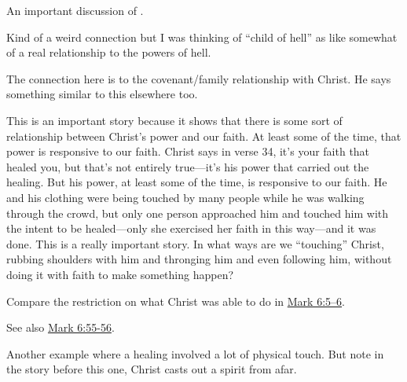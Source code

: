 \begin{compactdesc}
					\begin{compactitem}
						\item An important discussion of .
					\end{compactitem}
				\item[{\hyperref[MATTHEW-23-15]{Matthew 23:15}}] \phantom{.}
					\begin{compactitem}
						\item Kind of a weird connection but I was thinking of ``child of hell'' as like somewhat of a real relationship to the powers of hell.
					\end{compactitem}
				\item[{\hyperref[MARK-3-31]{Mark 3:31--35}}] \phantom{.}
					\begin{compactitem}
						\item The connection here is to the covenant/family relationship with Christ. He says something similar to this elsewhere too.
					\end{compactitem}
				\item[{\hyperref[MARK-5-24]{Mark 5:24--34}}] \phantom{.}
					\begin{compactitem}
						\item This is an important story because it shows that there is some sort of relationship between Christ's power and our faith. At least some of the time, that power is responsive to our faith. Christ says in verse 34, it's your faith that healed you, but that's not entirely true---it's his power that carried out the healing. But his power, at least some of the time, is responsive to our faith. He and his clothing were being touched by many people while he was walking through the crowd, but only one person approached him and touched him with the intent to be healed---only she exercised her faith in this way---and it was done. This is a really important story. In what ways are we ``touching'' Christ, rubbing shoulders with him and thronging him and even following him, without doing it with faith to make something happen?
						\item Compare the restriction on what Christ was able to do in \hyperref[MARK-6-5]{Mark 6:5--6}.
						\item See also \hyperref[MARK-6-55]{Mark 6:55-56}.
					\end{compactitem}
				\item[{\hyperref[MARK-7-32]{Mark 7:32--35}}] \phantom{.}
					\begin{compactitem}
						\item Another example where a healing involved a lot of physical touch. But note in the story before this one, Christ casts out a spirit from afar.

\end{compactitem}
\end{compactdesc}
